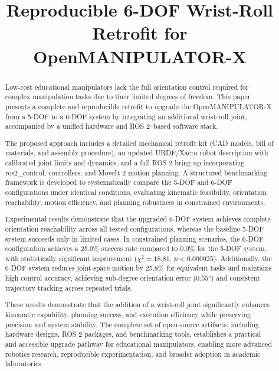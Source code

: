 \documentclass[conference]{IEEEtran}
\title{Reproducible 6-DOF Wrist-Roll Retrofit for OpenMANIPULATOR-X}
\author{
	\IEEEauthorblockA{
		CSE/ROBOTICS\\
		TELEPARADIGM TOWERS\\
		HYDERABAD, INDIA\\
		email@domain.com}
}
\begin{document}
	
	\maketitle
	
	\begin{abstract}
		Low-cost educational manipulators lack the full orientation control required for complex manipulation tasks due to their limited degrees of freedom. This paper presents a complete and reproducible retrofit to upgrade the OpenMANIPULATOR-X from a 5-DOF\cite{al2024ros} to a 6-DOF\cite{chitta2016moveit} system by integrating\cite{muepu2025toward} an additional wrist-roll joint\cite{norton2020developing}, accompanied by a unified hardware and ROS 2–based software stack.
		
		The proposed approach includes a detailed mechanical retrofit kit (CAD models, bill of materials, and assembly procedure), an updated URDF/Xacro robot description with calibrated joint limits and dynamics, and a full ROS 2 bring-up incorporating ros2\_control, controllers, and MoveIt 2 motion planning. A structured benchmarking framework is developed to systematically compare the 5-DOF and 6-DOF configurations under identical conditions, evaluating kinematic feasibility, orientation reachability, motion efficiency, and planning robustness in constrained environments.
		
		Experimental results demonstrate that the upgraded 6-DOF system achieves complete orientation reachability across all tested configurations, whereas the baseline 5-DOF system succeeds only in limited cases. In constrained planning scenarios, the 6-DOF configuration achieves a 25.0\% success rate compared to 0.0\% for the 5-DOF system, with statistically significant improvement ($\chi^2 = 18.81$, $p < 0.000025$). Additionally, the 6-DOF system reduces joint-space motion by 25.8\% for equivalent tasks and maintains high control accuracy, achieving sub-degree orientation error ($0.55°$) and consistent trajectory tracking across repeated trials.
		
		These results demonstrate that the addition of a wrist-roll joint significantly enhances kinematic capability, planning success, and execution efficiency while preserving precision and system stability. The complete set of open-source artifacts, including hardware designs, ROS 2 packages, and benchmarking tools, establishes a practical and accessible upgrade pathway for educational manipulators, enabling more advanced robotics research, reproducible experimentation, and broader adoption in academic laboratories.
		
		
	\end{abstract}
	
\end{document}

